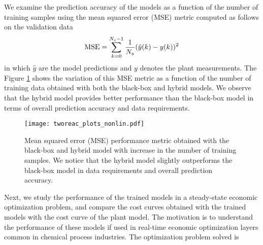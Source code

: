 \documentclass{article}
\begin{document}
We examine the prediction accuracy of the models as a function of the number of
training samples using the mean squared error (MSE) metric computed as follows
on the validation data
\begin{align*}
  \textnormal{MSE} =  \sum_{k=0}^{N_s-1} 
  \dfrac{1}{N_s}(\hat{y}(k) - y(k))^2
\end{align*}
in which $\hat{y}$ are the model predictions and $y$ denotes the plant
measurements. The Figure \ref{fig:validation_mse} shows the variation of this
MSE metric as a function of the number of training data obtained with both the
black-box and hybrid models. We observe that the hybrid model provides better
performance than the black-box model in terms of overall prediction accuracy and
data requirements.

\begin{figure}[!h]
  \centering
  \texttt{[image: tworeac\_plots\_nonlin.pdf]}
  \caption{Mean squared error (MSE) performance metric obtained with the
           black-box and hybrid model with increase in the number of training
           samples. We notice that the hybrid model slightly outperforms the
           black-box model in data requirements and 
           overall prediction accuracy.}
  \label{fig:validation_mse}
\end{figure}

Next, we study the performance of the trained models in a steady-state economic
optimization problem, and compare the cost curves obtained with the trained
models with the cost curve of the plant model. The motivation is to understand
the performance of these models if used in real-time economic optimization
layers common in chemical process industries. The optimization problem solved is
\end{document}
